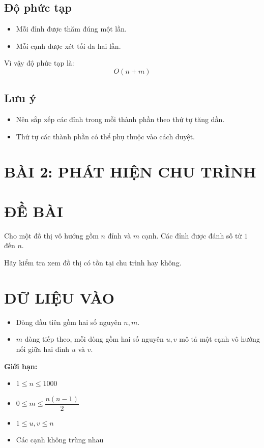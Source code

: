\documentclass[a4paper,12pt]{article}
\begin{document}
\subsection*{Độ phức tạp}
\begin{itemize}
    \item Mỗi đỉnh được thăm đúng một lần.
    \item Mỗi cạnh được xét tối đa hai lần.
\end{itemize}

Vì vậy độ phức tạp là:
\[
O(n + m)
\]

\subsection*{Lưu ý}
\begin{itemize}
    \item Nên sắp xếp các đỉnh trong mỗi thành phần theo thứ tự tăng dần.
    \item Thứ tự các thành phần có thể phụ thuộc vào cách duyệt.
\end{itemize}

\newpage

\section*{BÀI 2: PHÁT HIỆN CHU TRÌNH}

\section*{ĐỀ BÀI}
Cho một đồ thị vô hướng gồm $n$ đỉnh và $m$ cạnh. Các đỉnh được đánh số từ $1$ đến $n$.

Hãy kiểm tra xem đồ thị có tồn tại chu trình hay không.

\section*{DỮ LIỆU VÀO}
\begin{itemize}
    \item Dòng đầu tiên gồm hai số nguyên $n, m$.
    \item $m$ dòng tiếp theo, mỗi dòng gồm hai số nguyên $u, v$ mô tả một cạnh vô hướng nối giữa hai đỉnh $u$ và $v$.
\end{itemize}

\textbf{Giới hạn:}
\begin{itemize}
    \item $1 \le n \le 1000$
    \item $0 \le m \le \dfrac{n(n-1)}{2}$
    \item $1 \le u, v \le n$
    \item Các cạnh không trùng nhau
\end{itemize}
\end{document}
